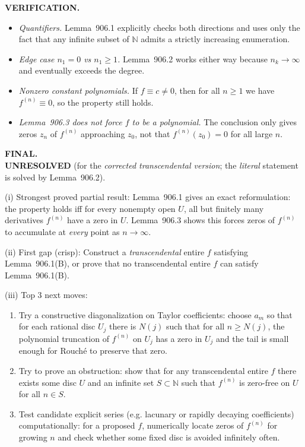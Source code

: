 \medskip
\noindent\textbf{VERIFICATION.}\\
\begin{itemize}
\item \emph{Quantifiers.} Lemma~906.1 explicitly checks both directions and uses only the fact that any infinite subset of $\mathbb{N}$ admits a strictly increasing enumeration.
\item \emph{Edge case $n_1=0$ vs $n_1\ge 1$.} Lemma~906.2 works either way because $n_k\to\infty$ and eventually exceeds the degree.
\item \emph{Nonzero constant polynomials.} If $f\equiv c\ne 0$, then for all $n\ge 1$ we have $f^{(n)}\equiv 0$, so the property still holds.
\item \emph{Lemma~906.3 does not force $f$ to be a polynomial.} The conclusion only gives zeros $z_n$ of $f^{(n)}$ approaching $z_0$, not that $f^{(n)}(z_0)=0$ for all large $n$.
\end{itemize}

\medskip
\noindent\textbf{FINAL.}\\
\textbf{UNRESOLVED} (for the \emph{corrected transcendental version}; the \emph{literal} statement is solved by Lemma~906.2).

(i) Strongest proved partial result: Lemma~906.1 gives an exact reformulation: the property holds iff for every nonempty open $U$, all but finitely many derivatives $f^{(n)}$ have a zero in $U$. Lemma~906.3 shows this forces zeros of $f^{(n)}$ to accumulate at \emph{every} point as $n\to\infty$.

(ii) First gap (crisp): Construct a \emph{transcendental} entire $f$ satisfying Lemma~906.1(B), or prove that no transcendental entire $f$ can satisfy Lemma~906.1(B).

(iii) Top 3 next moves:
\begin{enumerate}
\item Try a constructive diagonalization on Taylor coefficients: choose $a_m$ so that for each rational disc $U_j$ there is $N(j)$ such that for all $n\ge N(j)$, the polynomial truncation of $f^{(n)}$ on $U_j$ has a zero in $U_j$ and the tail is small enough for Rouch\'e to preserve that zero.
\item Try to prove an obstruction: show that for any transcendental entire $f$ there exists some disc $U$ and an infinite set $S\subset\mathbb{N}$ such that $f^{(n)}$ is zero-free on $U$ for all $n\in S$.
\item Test candidate explicit series (e.g. lacunary or rapidly decaying coefficients) computationally: for a proposed $f$, numerically locate zeros of $f^{(n)}$ for growing $n$ and check whether some fixed disc is avoided infinitely often.
\end{enumerate}

